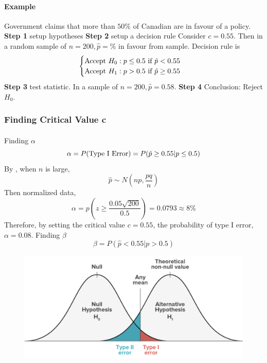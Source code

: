 \documentclass{article}
\begin{document}
			\paragraph{Example} Government claims that more than $50\%$ of Canadian are in favour of a policy.
			\newline
			\textbf{Step 1} setup hypotheses 
			\newline
			\textbf{Step 2} setup a decision rule 
			\newline Consider $c=0.55$. Then in a random sample of $n=200, \hat{p} = \%$ in favour from sample. Decision rule is
			\[
				\begin{cases}
					\text{{Accept $H_0: p \leq 0.5$ if $\hat{p} < 0.55$}} \\
					\text{{Accept $H_1: p > 0.5$ if $\hat{p} \geq 0.55$}}
				\end{cases}
			\]
			\newline \textbf{Step 3} test statistic. In a sample of $n=200, \hat{p}=0.58$.
			\newline \textbf{Step 4} Conclusion: Reject $H_0$.
			
			\subsubsection{Finding Critical Value c}
				\paragraph{} Finding $\alpha$
					\[
						\alpha = P(\text{{Type I Error}}) = P(\hat{p}\geq 0.55 \vert p \leq 0.5)
					\]
					By , when $n$ is large,
					\[
						\hat{p} \sim N(np, \frac{pq}{n})
					\]
					Then normalized data, 
					\[
						\alpha = p(z \geq \frac{0.05 \sqrt{200}}{0.5}) = 0.0793 \approx 8\%
					\]
					Therefore, by setting the critical value $c=0.55$, the probability of type I error, $\alpha = 0.08$.
					\newline
					Finding $\beta$
					\[
						\beta = P(\hat{p} < 0.55 \vert p > 0.5)
					\]
				\begin{figure}[h]
					\begin{center}
						\includegraphics[width=0.4\linewidth]{fig3}
					\end{center}
				\end{figure}
				
\end{document}
